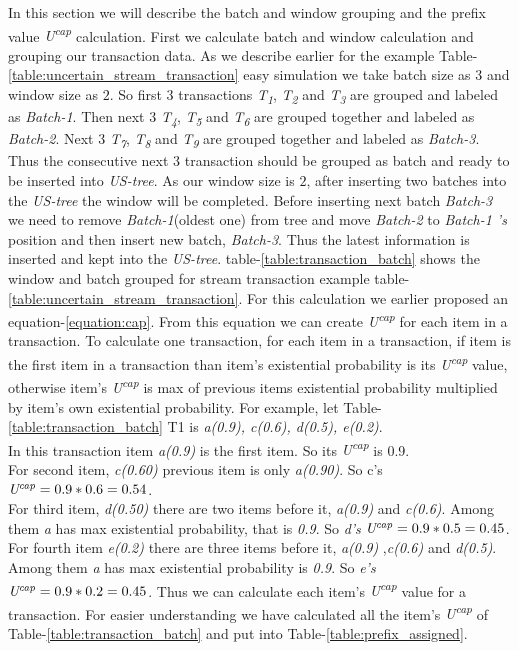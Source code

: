 \documentclass[conference]{IEEEtran}
\begin{document}
 
    In this section we will describe the batch and window grouping and the prefix value \emph{U\textsuperscript{cap}} calculation. First we calculate batch and window calculation and grouping our transaction data. As we describe earlier for the example Table-\ref{table:uncertain_stream_transaction} easy simulation we take batch size as \emph{$3$} and window size as \emph{$2$}. So first \emph{$3$} transactions \emph{T\textsubscript{1}}, \emph{T\textsubscript{2}} and \emph{T\textsubscript{3}} are grouped and labeled as \emph{Batch-1}. Then next \emph{$3$} \emph{T\textsubscript{4}}, \emph{T\textsubscript{5}} and \emph{T\textsubscript{6}} are grouped together and labeled as \emph{Batch-2}. Next \emph{$3$} \emph{T\textsubscript{7}}, \emph{T\textsubscript{8}} and \emph{T\textsubscript{9}} are grouped together and labeled as \emph{Batch-3}. Thus the consecutive next \emph{$3$} transaction should be grouped as batch and ready to be inserted into \emph{US-tree}. As our window size is $2$, after inserting two batches into the \emph{US-tree} the window will be completed. Before inserting next batch \emph{Batch-3} we need to remove \emph{Batch-1}(oldest one) from tree and move \emph{Batch-2} to \emph{Batch-1 's} position and then insert new batch, \emph{Batch-3}. Thus the latest information is inserted and kept into the \emph{US-tree}. table-\ref{table:transaction_batch} shows the window and batch grouped for stream transaction example table-\ref{table:uncertain_stream_transaction}.
    For this calculation we earlier proposed an equation-\ref{equation:cap}. From this equation we can create \emph{U\textsuperscript{cap}} for each item in a transaction. To calculate one transaction, for each item in a transaction, if item is the first item in a transaction than item's existential probability is its \emph{U\textsuperscript{cap}} value, otherwise item's \emph{U\textsuperscript{cap}} is max of previous items existential probability multiplied by item's  own existential probability. For example, let Table-\ref{table:transaction_batch} T1 is \emph{a(0.9), c(0.6), d(0.5), e(0.2)}. \\
    In this transaction item \emph{a(0.9)} is the first item. So its \emph{U\textsuperscript{cap}} is 0.9.\\
    For second item, \emph{c(0.60)} previous item is only \emph{a(0.90)}. So c's $\emph{U\textsuperscript{cap}} = 0.9*0.6 = 0.54$. \\
    For third item, \emph{d(0.50)} there are two items before it, \emph{a(0.9)} and \emph{c(0.6)}. Among them \emph{a} has max existential probability, that is \emph{0.9}. So \emph{d's } $\emph{U\textsuperscript{cap}} = 0.9*0.5 = 0.45$.\\
    For fourth item \emph{e(0.2)} there are three items before it, \emph{a(0.9)} ,\emph{c(0.6)} and \emph{d(0.5)}. Among them \emph{a} has max existential probability is \emph{0.9}. So \emph{e's}  $\emph{U\textsuperscript{cap}} = 0.9*0.2 = 0.45$. Thus we can calculate each item's \emph{U\textsuperscript{cap}} value for a transaction. For easier understanding we have calculated all the item's \emph{U\textsuperscript{cap}} of Table-\ref{table:transaction_batch} and put into Table-\ref{table:prefix_assigned}.
   
\end{document}
